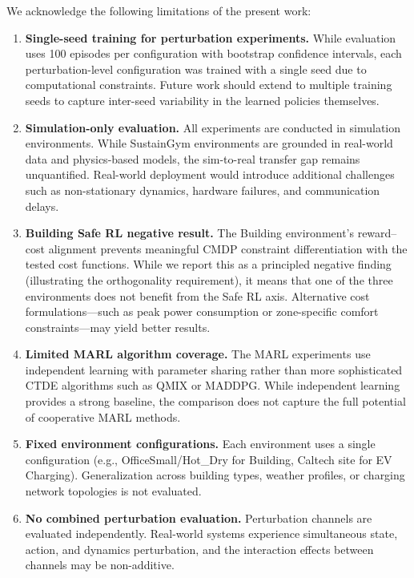 We acknowledge the following limitations of the present work:

\begin{enumerate}
    \item \textbf{Single-seed training for perturbation experiments.} While evaluation uses 100 episodes per configuration with bootstrap confidence intervals, each perturbation-level configuration was trained with a single seed due to computational constraints. Future work should extend to multiple training seeds to capture inter-seed variability in the learned policies themselves.

    \item \textbf{Simulation-only evaluation.} All experiments are conducted in simulation environments. While SustainGym environments are grounded in real-world data and physics-based models, the sim-to-real transfer gap remains unquantified. Real-world deployment would introduce additional challenges such as non-stationary dynamics, hardware failures, and communication delays.

    \item \textbf{Building Safe RL negative result.} The Building environment's reward--cost alignment prevents meaningful CMDP constraint differentiation with the tested cost functions. While we report this as a principled negative finding (illustrating the orthogonality requirement), it means that one of the three environments does not benefit from the Safe RL axis. Alternative cost formulations---such as peak power consumption or zone-specific comfort constraints---may yield better results.

    \item \textbf{Limited MARL algorithm coverage.} The MARL experiments use independent learning with parameter sharing rather than more sophisticated CTDE algorithms such as QMIX or MADDPG. While independent learning provides a strong baseline, the comparison does not capture the full potential of cooperative MARL methods.

    \item \textbf{Fixed environment configurations.} Each environment uses a single configuration (e.g., OfficeSmall/Hot\_Dry for Building, Caltech site for EV Charging). Generalization across building types, weather profiles, or charging network topologies is not evaluated.

    \item \textbf{No combined perturbation evaluation.} Perturbation channels are evaluated independently. Real-world systems experience simultaneous state, action, and dynamics perturbation, and the interaction effects between channels may be non-additive.
\end{enumerate}

